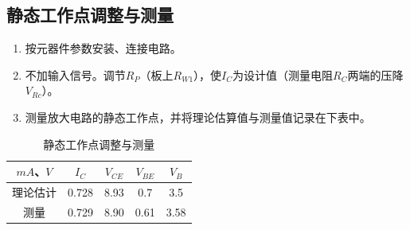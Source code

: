\documentclass{../source/Experiment}
\begin{document}
        \subsection{静态工作点调整与测量}
            \begin{enumerate}
            \item 按元器件参数安装、连接电路。
            \item 不加输入信号。调节$R_P$（板上$R_{W1}$），使$I_C$为设计值（测量电阻$R_C$两端的压降$V_{Rc}$）。
            \item 测量放大电路的静态工作点，并将理论估算值与测量值记录在下表中。
            \end{enumerate}
            \begin{table}[htbp]
                \centering
                \begin{tabular}{|c|c|c|c|c|}
                \hline
                $mA$、$V$ & $I_C$ &  $V_{CE}$& $V_{BE}$ & $V_B$ \\ \hline
                 理论估计& 0.728 & 8.93 & 0.7 & 3.5 \\ \hline
                 测量& 0.729 & 8.90 & 0.61 & 3.58 \\ \hline
                \end{tabular}
                \caption{静态工作点调整与测量}
            \end{table}
\end{document}
